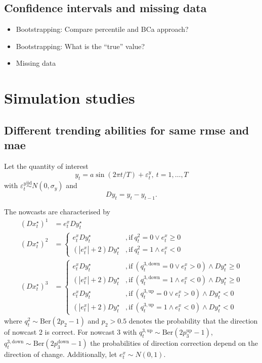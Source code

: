 \documentclass[oneside]{article}
\theoremstyle{plain}%
\theoremstyle{definition}
\newcommand{\ydiff}{D y}
\newcommand{\ydifft}{Dy^\star}
\newcommand{\xdifft}{Dx^\star}
\begin{document}
\subsection{Confidence intervals and missing data}


\begin{itemize}
  \item Bootstrapping: Compare percentile and BCa approach?
  \item Bootstrapping: What is the \enquote{true} value?
  \item Missing data
\end{itemize}


\section{Simulation studies}

\subsection{Different trending abilities for same rmse and mae} \label{sec:simulation_rmse_mae}

Let the quantity of interest 
\begin{equation}\label{eq: simulation}
  y_t = a \sin(2 \pi t / T) + \varepsilon_t^y, \ t = 1, \dots, T
\end{equation}
with $\varepsilon_t^y \stackrel{\text{iid}}{\sim} N(0, \sigma_y)$ and 
\begin{equation}
  \ydiff_t = y_t - y_{t-1}.
\end{equation}

The nowcasts are characterised by 
\begin{align}
	(\xdifft_t)^1 &= e^x_t \ydifft_t \\
	(\xdifft_t)^2 &= \begin{cases}
		e^x_t \ydifft_t &, \text{if}\ q^2_t = 0 \lor e^x_t \geq 0\\
		(| e^x_t | + 2) \ydifft_t &, \text{if}\ q^2_t = 1 \land e^x_t < 0
	\end{cases} \\
	(\xdifft_t)^3 &= \begin{cases}
		e^x_t \ydifft_t &, \text{if}\ (q^{3, \text{down}}_t = 0 \lor e^x_t > 0) \land \ydifft_t \geq 0\\
		(| e^x_t | + 2) \ydifft_t &, \text{if}\ (q^{3, \text{down}}_t = 1 \land e^x_t < 0) \land \ydifft_t \geq 0 \\
		e^x_t \ydifft_t &, \text{if}\ (q^{3, \text{up}}_t = 0 \lor e^x_t > 0) \land \ydifft_t < 0\\
		(| e^x_t | + 2) \ydifft_t &, \text{if}\ (q^{3, \text{up}}_t = 1 \land e^x_t < 0) \land \ydifft_t < 0
	\end{cases}
\end{align}
where $q^2_t \sim \text{Ber}(2p_2 - 1)$ and $p_2 > 0.5$ denotes the probability that the direction of nowcast 2 is correct.
For nowcast 3 with $q^{3, \text{up}}_t \sim \text{Ber}(2p_3^{\text{up}}-1)$, $q^{3, \text{down}}_t \sim \text{Ber}(2p_3^{\text{down}}-1)$ the probabilities of direction correction depend on the direction of change. Additionally, let $e^x_t \sim N(0, 1)$.
\end{document}
